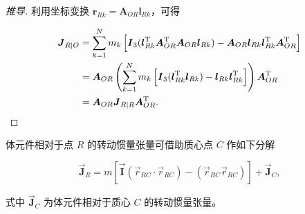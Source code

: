 \begin{proof}[推导]
利用坐标变换 $\boldsymbol{r}_{Rk} = \boldsymbol{A}_{OR} \boldsymbol{l}_{Rk}$，可得

\begin{align*}\boldsymbol{J}_{R|O} &= \sum_{k=1}^{N} m_k \left[ \boldsymbol{I}_3 (\boldsymbol{l}_{Rk}^{\mathrm{T}} \boldsymbol{A}_{OR}^{\mathrm{T}} \boldsymbol{A}_{OR} \boldsymbol{l}_{Rk}) - \boldsymbol{A}_{OR} \boldsymbol{l}_{Rk} \boldsymbol{l}_{Rk}^{\mathrm{T}} \boldsymbol{A}_{OR}^{\mathrm{T}} \right] \notag \\
&= \boldsymbol{A}_{OR} \left( \sum_{k=1}^{N} m_k \left[ \boldsymbol{I}_3 (\boldsymbol{l}_{Rk}^{\mathrm{T}} \boldsymbol{l}_{Rk}) - \boldsymbol{l}_{Rk} \boldsymbol{l}_{Rk}^{\mathrm{T}} \right] \right) \boldsymbol{A}_{OR}^{\mathrm{T}} \notag \\
&= \boldsymbol{A}_{OR} \boldsymbol{J}_{R|R} \boldsymbol{A}_{OR}^{\mathrm{T}}.\end{align*}
\end{proof}
\begin{theorem}[定理 8.6（转动惯量张量的平行移轴定理）]
体元件相对于点 $R$ 的转动惯量张量可借助质心点 $C$ 作如下分解

\[
\vec{\boldsymbol{J}}_R = m \left[ \vec{\boldsymbol{I}} (\vec{r}_{RC} \cdot \vec{r}_{RC}) - (\vec{r}_{RC} \vec{r}_{RC}) \right] + \vec{\boldsymbol{J}}_C,
\]

式中 $\vec{\boldsymbol{J}}_C$ 为体元件相对于质心 $C$ 的转动惯量张量。
\end{theorem}
